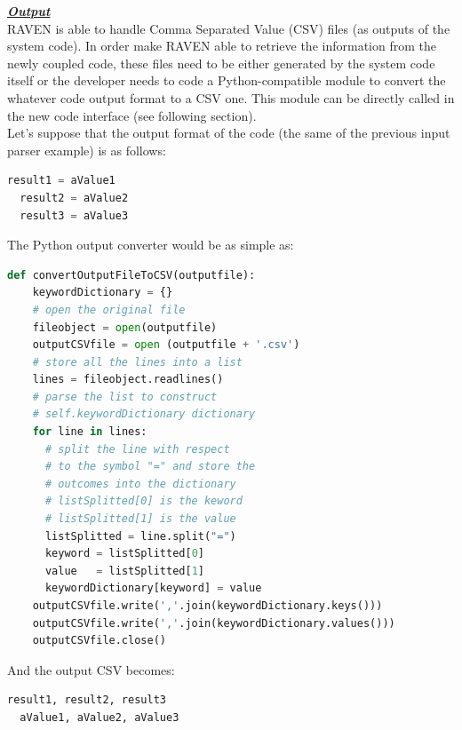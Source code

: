 \textbf{\textit{\underline{Output}}}
\newline
\\RAVEN is able to handle Comma Separated Value (CSV) files (as outputs
of the system code). In order make RAVEN able to retrieve the information
 from the newly coupled code, these files need to be  either generated by the
 system code itself or the developer needs to code a Python-compatible
module to convert the whatever code output format to a CSV one.
This module can be  directly called in the new code interface (see following section).
\\ Let's suppose that the output format of the code (the same of the previous
input parser example) is as follows:
\begin{lstlisting}[language=python]
  result1 = aValue1
  result2 = aValue2
  result3 = aValue3
\end{lstlisting}
The Python output converter would be as simple as:
\begin{lstlisting}[language=python]
def convertOutputFileToCSV(outputfile):
    keywordDictionary = {}
    # open the original file
    fileobject = open(outputfile)
    outputCSVfile = open (outputfile + '.csv')
    # store all the lines into a list
    lines = fileobject.readlines()
    # parse the list to construct
    # self.keywordDictionary dictionary
    for line in lines:
      # split the line with respect
      # to the symbol "=" and store the
      # outcomes into the dictionary
      # listSplitted[0] is the keword
      # listSplitted[1] is the value
      listSplitted = line.split("=")
      keyword = listSplitted[0]
      value   = listSplitted[1]
      keywordDictionary[keyword] = value
    outputCSVfile.write(','.join(keywordDictionary.keys()))
    outputCSVfile.write(','.join(keywordDictionary.values()))
    outputCSVfile.close()
\end{lstlisting}
And the output CSV becomes:
\begin{lstlisting}[language=python]
  result1, result2, result3
  aValue1, aValue2, aValue3
\end{lstlisting}
